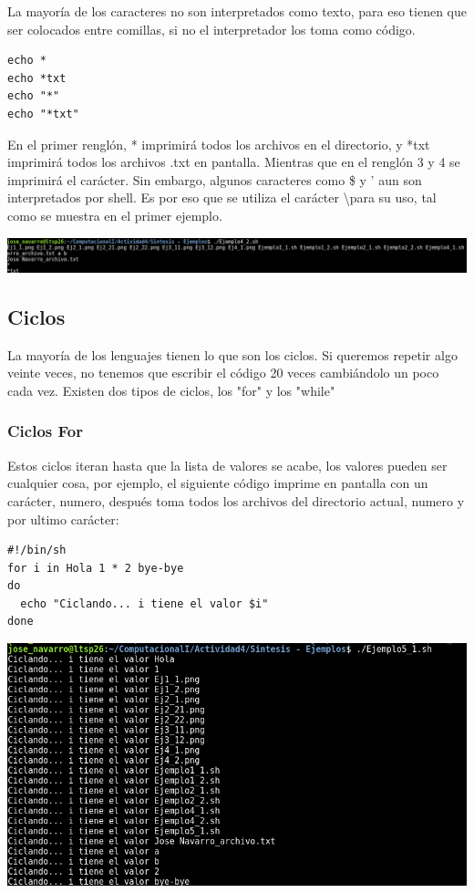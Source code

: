 \documentclass[12pt]{article}
\begin{document}
La mayoría de los caracteres no son interpretados como texto, para eso tienen que ser colocados entre comillas, si no el interpretador los toma como código.

\begin{verbatim}
echo * 
echo *txt
echo "*" 
echo "*txt"
\end{verbatim}

En el primer renglón, * imprimirá todos los archivos en el directorio, y *txt imprimirá todos los archivos .txt en pantalla. Mientras que en el renglón 3 y 4 se imprimirá el carácter. Sin embargo, algunos caracteres como \$ y ' aun son interpretados por shell. Es por eso que se utiliza el carácter \textbackslash para su uso, tal como se muestra en el primer ejemplo. 

\begin{center}
\includegraphics[scale=0.35]{Ej4_2.png}
\end{center} 

\subsection{Ciclos}
La mayoría de los lenguajes tienen lo que son los ciclos. Si queremos repetir algo veinte veces, no tenemos que escribir el código 20 veces cambiándolo un poco cada vez. Existen dos tipos de ciclos, los "for" y los "while"

\subsubsection{Ciclos For}
Estos ciclos iteran hasta que la lista de valores se acabe, los valores pueden ser cualquier cosa, por ejemplo, el siguiente código imprime en pantalla con un carácter, numero, después toma todos los archivos del directorio actual, numero y por ultimo carácter:

\begin{verbatim}
#!/bin/sh
for i in Hola 1 * 2 bye-bye 
do
  echo "Ciclando... i tiene el valor $i"
done
\end{verbatim}

\begin{center}
\includegraphics[scale=0.5]{Ej5_1.png}
\end{center} 
\end{document}
